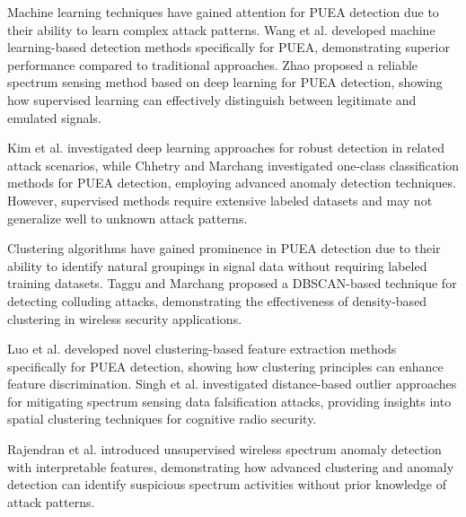 \documentclass[pdflatex,sn-mathphys-num]{sn-jnl}%
\theoremstyle{thmstyleone}
\theoremstyle{thmstyletwo}
\theoremstyle{thmstylethree}
\begin{document}
Machine learning techniques have gained attention for PUEA detection due to their ability to learn complex attack patterns. Wang et al. \cite{ref9} developed machine learning-based detection methods specifically for PUEA, demonstrating superior performance compared to traditional approaches. Zhao \cite{ref22} proposed a reliable spectrum sensing method based on deep learning for PUEA detection, showing how supervised learning can effectively distinguish between legitimate and emulated signals.

Kim et al. \cite{ref10} investigated deep learning approaches for robust detection in related attack scenarios, while Chhetry and Marchang \cite{ref23} investigated one-class classification methods for PUEA detection, employing advanced anomaly detection techniques. However, supervised methods require extensive labeled datasets and may not generalize well to unknown attack patterns.


Clustering algorithms have gained prominence in PUEA detection due to their ability to identify natural groupings in signal data without requiring labeled training datasets. Taggu and Marchang \cite{ref21} proposed a DBSCAN-based technique for detecting colluding attacks, demonstrating the effectiveness of density-based clustering in wireless security applications.

Luo et al. \cite{ref13} developed novel clustering-based feature extraction methods specifically for PUEA detection, showing how clustering principles can enhance feature discrimination. Singh et al. \cite{ref14} investigated distance-based outlier approaches for mitigating spectrum sensing data falsification attacks, providing insights into spatial clustering techniques for cognitive radio security.

Rajendran et al. \cite{ref12} introduced unsupervised wireless spectrum anomaly detection with interpretable features, demonstrating how advanced clustering and anomaly detection can identify suspicious spectrum activities without prior knowledge of attack patterns.

\end{document}
